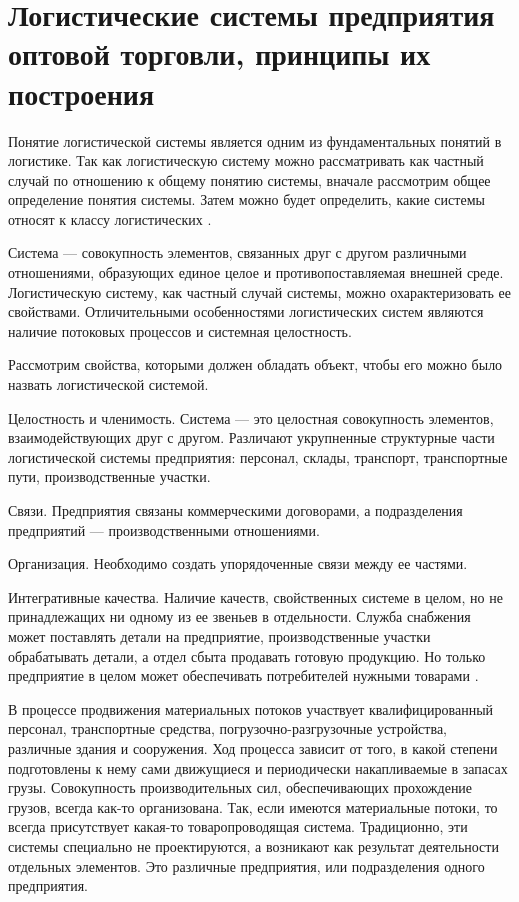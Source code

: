 \section{Логистические системы предприятия оптовой торговли, принципы их построения}

Понятие логистической системы является одним из фундаментальных понятий в логистике.
Так как логистическую систему можно рассматривать как частный случай по отношению к общему понятию системы, вначале рассмотрим общее определение понятия системы.
Затем можно будет определить, какие системы относят к классу логистических \cite[с. 82]{gadzhinskiy}.

Система --- совокупность элементов, связанных друг с другом различными отношениями, образующих единое целое и противопоставляемая внешней среде.
Логистическую систему, как частный случай системы, можно охарактеризовать ее свойствами.
Отличительными особенностями логистических систем являются наличие потоковых процессов и системная целостность.

Рассмотрим свойства, которыми должен обладать объект, чтобы его можно было назвать логистической системой.

Целостность и членимость. Система --- это целостная совокупность элементов, взаимодействующих друг с другом.
Различают укрупненные структурные части логистической системы предприятия: персонал, склады, транспорт, транспортные пути, производственные участки.

Связи. Предприятия связаны коммерческими договорами, а подразделения предприятий --- производственными отношениями.

Организация. Необходимо создать упорядоченные связи между ее частями.

Интегративные качества. Наличие качеств, свойственных системе в целом, но не принадлежащих ни одному из ее звеньев в отдельности.
Служба снабжения может поставлять детали на предприятие, производственные участки обрабатывать детали, а отдел сбыта продавать готовую продукцию.
Но только предприятие в целом может обеспечивать потребителей нужными товарами \cites[с. 114-115]{levkin}[с. 83]{gadzhinskiy}.

В процессе продвижения материальных потоков участвует квалифицированный персонал, транспортные средства, погрузочно-разгрузочные устройства, различные здания и сооружения.
Ход процесса зависит от того, в какой степени подготовлены к нему сами движущиеся и периодически накапливаемые в запасах грузы.
Совокупность производительных сил, обеспечивающих прохождение грузов, всегда как-то организована.
Так, если имеются материальные потоки, то всегда присутствует какая-то товаропроводящая система.
Традиционно, эти системы специально не проектируются, а возникают как результат деятельности отдельных элементов.
Это различные предприятия, или подразделения одного предприятия.

